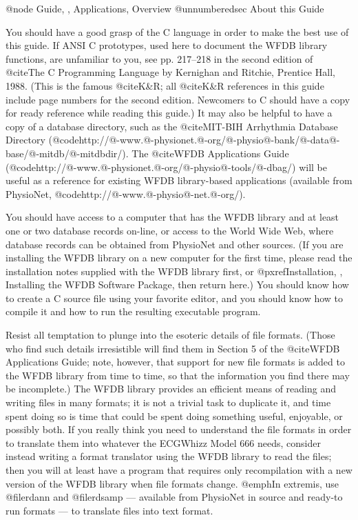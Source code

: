 @node     Guide, , Applications, Overview
@unnumberedsec About this Guide

You should have a good grasp of the C language in order to make the best use of
this guide.  If ANSI C prototypes, used here to document the WFDB library
functions, are unfamiliar to you, see pp. 217--218 in the second edition of
@cite{The C Programming Language} by Kernighan and Ritchie, Prentice Hall,
1988.  (This is the famous @cite{K&R}; all @cite{K&R} references in this guide
include page numbers for the second edition.  Newcomers to C should have a copy
for ready reference while reading this guide.)  It may also be helpful to have
a copy of a database directory, such as the @cite{MIT-BIH Arrhythmia Database
Directory}
(@code{http://@-www.@-physionet.@-org/@-physio@-bank/@-data@-base/@-mitdb/@-mitdbdir/}).
The @cite{WFDB Applications Guide}
(@code{http://@-www.@-physionet.@-org/@-physio@-tools/@-dbag/}) will be useful
as a reference for existing WFDB library-based applications (available from
PhysioNet, @code{http://@-www.@-physio@-net.@-org/}).

You should have access to a computer that has the WFDB library and at
least one or two database records on-line, or access to the World Wide Web,
where database records can be obtained from PhysioNet and other sources.  (If
you are installing the WFDB library on a new computer for the first time,
please read the installation notes supplied with the WFDB library first, or
@pxref{Installation, , Installing the WFDB Software Package}, then return
here.)  You should know how to create a C source file using your
favorite editor, and you should know how to compile it and how to run
the resulting executable program.

Resist all temptation to plunge into the esoteric details of file
formats.  (Those who find such details irresistible will find them in
Section 5 of the @cite{WFDB Applications Guide}; note, however, that
support for new file formats is added to the WFDB library from time to
time, so that the information you find there may be incomplete.)  The
WFDB library provides an efficient means of reading and writing files in
many formats; it is not a trivial task to duplicate it, and time spent
doing so is time that could be spent doing something useful, enjoyable,
or possibly both.  If you really think you need to understand the file
formats in order to translate them into whatever the ECGWhizz Model 666
needs, consider instead writing a format translator using the WFDB
library to read the files; then you will at least have a program that
requires only recompilation with a new version of the WFDB library when
file formats change.  @emph{In extremis}, use @file{rdann} and
@file{rdsamp} --- available from PhysioNet in source and ready-to run
formats --- to translate files into text format.

